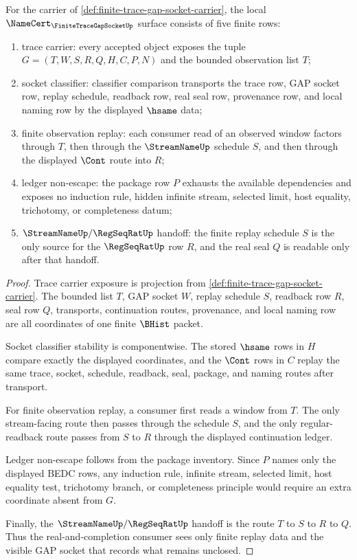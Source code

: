 \begin{theorem}
\label{thm:finite-trace-gap-socket-namecert-obligations}
For the carrier of \autoref{def:finite-trace-gap-socket-carrier}, the local $\NameCert_{\FiniteTraceGapSocketUp}$ surface consists of five finite rows:
\begin{enumerate}
\item trace carrier: every accepted object exposes the tuple $G=(T,W,S,R,Q,H,C,P,N)$ and the bounded observation list $T$;
\item socket classifier: classifier comparison transports the trace row, GAP socket row, replay schedule, readback row, real seal row, provenance row, and local naming row by the displayed $\hsame$ data;
\item finite observation replay: each consumer read of an observed window factors through $T$, then through the $\StreamNameUp$ schedule $S$, and then through the displayed $\Cont$ route into $R$;
\item ledger non-escape: the package row $P$ exhausts the available dependencies and exposes no induction rule, hidden infinite stream, selected limit, host equality, trichotomy, or completeness datum;
\item $\StreamNameUp/\RegSeqRatUp$ handoff: the finite replay schedule $S$ is the only source for the $\RegSeqRatUp$ row $R$, and the real seal $Q$ is readable only after that handoff.
\end{enumerate}
\end{theorem}
\begin{proof}
Trace carrier exposure is projection from \autoref{def:finite-trace-gap-socket-carrier}. The bounded list $T$, GAP socket $W$, replay schedule $S$, readback row $R$, seal row $Q$, transports, continuation routes, provenance, and local naming row are all coordinates of one finite $\BHist$ packet.

Socket classifier stability is componentwise. The stored $\hsame$ rows in $H$ compare exactly the displayed coordinates, and the $\Cont$ rows in $C$ replay the same trace, socket, schedule, readback, seal, package, and naming routes after transport.

For finite observation replay, a consumer first reads a window from $T$. The only stream-facing route then passes through the schedule $S$, and the only regular-readback route passes from $S$ to $R$ through the displayed continuation ledger.

Ledger non-escape follows from the package inventory. Since $P$ names only the displayed BEDC rows, any induction rule, infinite stream, selected limit, host equality test, trichotomy branch, or completeness principle would require an extra coordinate absent from $G$.

Finally, the $\StreamNameUp/\RegSeqRatUp$ handoff is the route $T$ to $S$ to $R$ to $Q$. Thus the real-and-completion consumer sees only finite replay data and the visible GAP socket that records what remains unclosed.
\end{proof}

